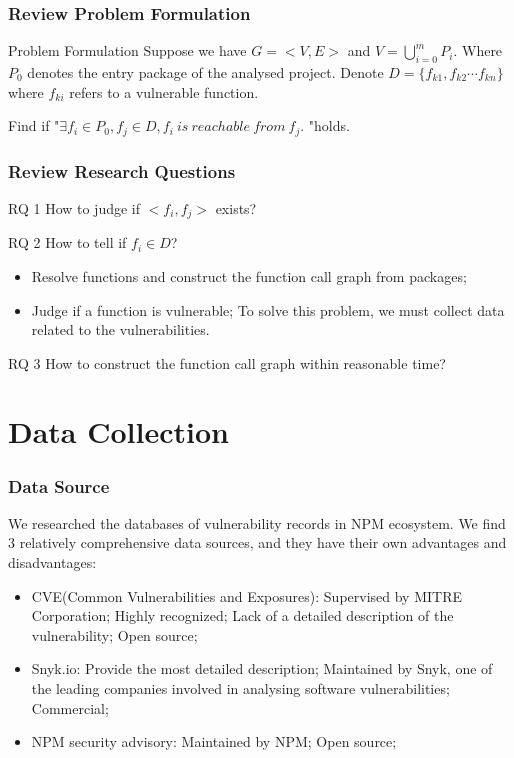 \documentclass[notheorems, aspectratio=54]{beamer}
\begin{document}
\begin{frame}
    \frametitle{Review Problem Formulation}
    \begin{block}{Problem Formulation}
        Suppose we have $G = <V,E>$ and $V=\bigcup_{i=0}^{m} P_i$. Where $P_0$ denotes the entry package of the analysed project. Denote $D=\{f_{k1}, f_{k2}\cdots f_{kn}\}$ where $f_{ki}$ refers to a vulnerable function.

        Find if "$\exists f_i \in P_0, f_j \in D, f_i\ is\ reachable\ from\ f_j.$ "holds.
    \end{block}
\end{frame}

\begin{frame}
    \frametitle{Review Research Questions}
    \begin{block}{RQ 1}
        How to judge if $<f_i, f_j>$ exists?
    \end{block}
    \begin{exampleblock}{RQ 2}
        How to tell if $f_i \in D$?
        \begin{itemize}
            \item Resolve functions  and construct the function call graph from packages;
            \item Judge if a function is vulnerable; To solve this problem, we must collect data related to the vulnerabilities. 
        \end{itemize}
    \end{exampleblock}
    \begin{block}{RQ 3}
        How to construct the function call graph within reasonable time?
    \end{block}
\end{frame}

\section{Data Collection}
\begin{frame}
    \tableofcontents[currentsection]
\end{frame}

\begin{frame}
    \frametitle{Data Source}
    We researched the databases of vulnerability records in NPM ecosystem. We find 3 relatively comprehensive data sources, and they have their own advantages and disadvantages:
    \begin{itemize}
        \item CVE(Common Vulnerabilities and Exposures): Supervised by MITRE Corporation; Highly recognized; Lack of a detailed description of the vulnerability; Open source;  
        \item Snyk.io: Provide the most detailed description; Maintained by Snyk, one of the leading companies involved in analysing software vulnerabilities; Commercial;
        \item \textcolor{MyRed}{NPM security advisory}: Maintained by NPM; Open source;
    \end{itemize}
\end{frame}
\end{document}

